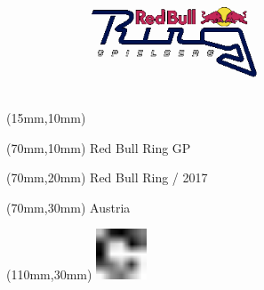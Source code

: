 \null\newpage
\begin{textblock*}{50mm}(15mm,10mm)%
\includegraphics[width=50mm]{LG/RED.png}
\end{textblock*}
\begin{textblock*}{130mm}(70mm,10mm)%
{\fontsize{20}{20}\selectfont Red Bull Ring GP}\\
\end{textblock*}
\begin{textblock*}{120mm}(70mm,20mm)%
{\fontsize{16}{16}\selectfont Red Bull Ring / 2017}\\
\end{textblock*}
\begin{textblock*}{120mm}(70mm,30mm)%
{\fontsize{12}{12}\selectfont Austria}
\end{textblock*}
\begin{textblock*}{30mm}(110mm,30mm)%
\centering
\includegraphics[height=15mm]{icons/fa-rotate-right.pdf}
\end{textblock*}
